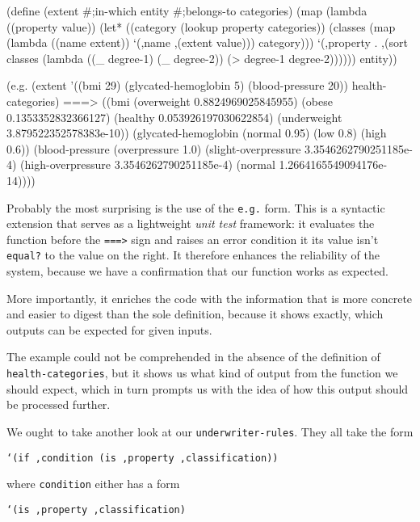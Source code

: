 \begin{Snippet}
(define (extent #;in-which entity #;belongs-to categories)
  (map (lambda ((property value))
	 (let* ((category (lookup property categories))
		(classes (map (lambda ((name extent))
				`(,name ,(extent value)))
			      category)))
	   `(,property . ,(sort classes
				(lambda ((_ degree-1) (_ degree-2))
				  (> degree-1 degree-2))))))
       entity))
\end{Snippet}
\begin{Snippet}
(e.g.
 (extent '((bmi 29) (glycated-hemoglobin 5) (blood-pressure 20))
         health-categories)
 ===> ((bmi (overweight 0.8824969025845955) 
            (obese 0.1353352832366127) 
            (healthy 0.053926197030622854)
            (underweight 3.879522352578383e-10)) 
       (glycated-hemoglobin (normal 0.95) (low 0.8) (high 0.6)) 
       (blood-pressure (overpressure 1.0) 
                       (slight-overpressure 3.3546262790251185e-4) 
                       (high-overpressure 3.3546262790251185e-4)
                       (normal 1.2664165549094176e-14))))
\end{Snippet}

Probably the most surprising is the use of the \texttt{e.g.} form.
This is a syntactic extension that serves as a lightweight
\textit{unit test} framework: it evaluates the function before
the \texttt{===>} sign and raises an error condition it
its value isn't \texttt{equal?} to the value on the right.
It therefore enhances the reliability of the system, because
we have a confirmation that our function works as expected.

More importantly, it enriches the code with the information that
is more concrete and easier to digest than the sole definition,
because it shows exactly, which outputs can be expected for
given inputs.

The example could not be comprehended in the absence of
the definition of \texttt{health-categories}, but it shows
us what kind of output from the function we should expect,
which in turn prompts us with the idea of how this output
should be processed further.

We ought to take another look at our \texttt{underwriter\--rules}.
They all take the form 

\texttt{`(if ,condition (is ,property ,classification))}

where \texttt{condition} either has a form 

\texttt{`(is ,property ,classification)}

